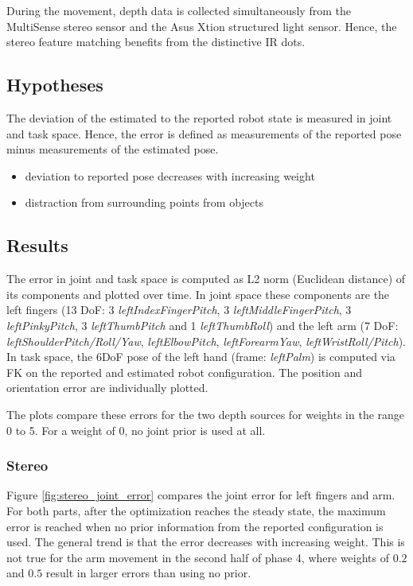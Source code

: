 During the movement, depth data is collected simultaneously from the MultiSense stereo sensor and the Asus Xtion structured light sensor. Hence, the stereo feature matching benefits from the distinctive IR dots.

\subsection{Hypotheses}

The deviation of the estimated to the reported robot state is measured in joint and task space. Hence, the error is defined as measurements of the reported pose minus measurements of the estimated pose.

\begin{itemize}
\item deviation to reported pose decreases with increasing weight
\item distraction from surrounding points from objects
\end{itemize}

\subsection{Results}

The error in joint and task space is computed as L2 norm (Euclidean distance) of its components and plotted over time. In joint space these components are the left fingers (13 DoF: 3 \emph{leftIndexFingerPitch}, 3 \emph{leftMiddleFingerPitch}, 3 \emph{leftPinkyPitch}, 3 \emph{leftThumbPitch} and 1 \emph{leftThumbRoll}) and the left arm (7 DoF: \emph{leftShoulderPitch/Roll/Yaw}, \emph{leftElbowPitch}, \emph{leftForearmYaw}, \emph{leftWristRoll/Pitch}). In task space, the 6DoF pose of the left hand (frame: \emph{leftPalm}) is computed via FK on the reported and estimated robot configuration. The position and orientation error are individually plotted.

The plots compare these errors for the two depth sources for weights in the range 0 to 5. For a weight of 0, no joint prior is used at all.


\subsubsection{Stereo}

Figure \ref{fig:stereo_joint_error} compares the joint error for left fingers and arm. For both parts, after the optimization reaches the steady state, the maximum error is reached when no prior information from the reported configuration is used.
The general trend is that the error decreases with increasing weight. This is not true for the arm movement in the second half of phase 4, where weights of $0.2$ and $0.5$ result in larger errors than using no prior.

